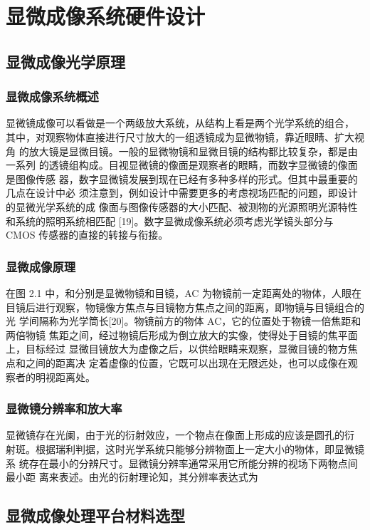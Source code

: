 \chapter{显微成像系统硬件设计}
\section{显微成像光学原理}
\subsection{显微成像系统概述}
显微镜成像可以看做是一个两级放大系统，从结构上看是两个光学系统的组合， 其中，对观察物体直接进行尺寸放大的一组透镜成为显微物镜，靠近眼睛、扩大视角 的放大镜是显微目镜。一般的显微物镜和显微目镜的结构都比较复杂，都是由一系列 的透镜组构成。目视显微镜的像面是观察者的眼睛，而数字显微镜的像面是图像传感 器，数字显微镜发展到现在已经有多种多样的形式。但其中最重要的几点在设计中必 须注意到，例如设计中需要更多的考虑视场匹配的问题，即设计的显微光学系统的成 像面与图像传感器的大小匹配、被测物的光源照明光源特性和系统的照明系统相匹配 [19]。数字显微成像系统必须考虑光学镜头部分与 CMOS 传感器的直接的转接与衔接。 
\subsection{显微成像原理}
在图 2.1 中，和分别是显微物镜和目镜，AC 为物镜前一定距离处的物体，人眼在 目镜后进行观察，物镜像方焦点与目镜物方焦点之间的距离，即物镜与目镜组合的光 学间隔称为光学筒长[20]。物镜前方的物体 AC，它的位置处于物镜一倍焦距和两倍物镜 焦距之间，经过物镜后形成为倒立放大的实像，使得处于目镜的焦平面上，目标经过 显微目镜放大为虚像之后，以供给眼睛来观察，显微目镜的物方焦点和之间的距离决 定着虚像的位置，它既可以出现在无限远处，也可以成像在观察者的明视距离处。
\subsection{显微镜分辨率和放大率}
显微镜存在光阑，由于光的衍射效应，一个物点在像面上形成的应该是圆孔的衍 射斑。根据瑞利判据，这时光学系统只能够分辨物面上一定大小的物体，即显微镜系 统存在最小的分辨尺寸。显微镜分辨率通常采用它所能分辨的视场下两物点间最小距 离来表述。由光的衍射理论知，其分辨率表达式为 

\section{显微成像处理平台材料选型}
